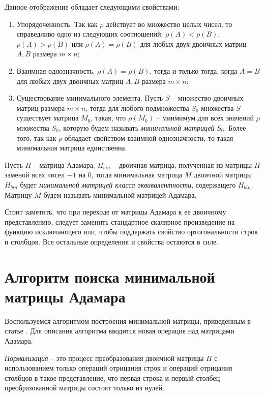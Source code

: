 Данное отображение обладает следующими свойствами:
\begin{enumerate}
    \item Упорядоченность. Так как $\rho$ действует во множество целых чисел, то справедливо одно из следующих соотношений: $\rho(A) < \rho(B)$, $\rho(A) > \rho(B)$ или $\rho(A) = \rho(B)$ для любых двух двоичных матриц $A, B$ размера $m \times n$;
    \item Взаимная однозначность. $\rho(A) = \rho(B)$, тогда и только тогда, когда $A = B$ для любых двух двоичных матриц $A, B$ размера $m \times n$;
    \item Существование минимального элемента. Пусть $S$ -- множество двоичных матриц размера $m \times n$, тогда для любого подмножества $S_0$ множества $S$ существует матрица $M_0$, такая, что $\rho(M_0)$ -- минмимум для всех значений $\rho$ множества $S_0$, которую будем называть {\it минимальной матрицей} $S_0$. Более того, так как $\rho$ обладает свойством взаимной однозначности, то такая минимальная матрица единственна.
\end{enumerate}

\begin{Df}\normalfont\label{df:min_had}
    Пусть $H$ -- матрица Адамара, $H_{bin}$ -- двоичная матрица, полученная из матрицы $H$ заменой всех чисел $-1$ на $0$, тогда минимальная матрица $M$ двоичной матрицы $H_{bin}$ будет {\it минимальной матрицей класса эквивалентности}, содержащего $H_{bin}$. Матрицу $M$ будем называть минимальной матрицей Адамара.
\end{Df}

Стоит заметить, что при переходе от матрицы Адамара к ее двоичному представлению, следует заменить стандартное скалярное произведение на функцию исключающего или, чтобы поддержать свойство ортогональности строк и столбцов. Все остальные определения и свойства остаются в силе.

\section{Алгоритм поиска минимальной матрицы Адамара}
\label{mm_finder_th}

Воспользуемся алгоритмом построения минимальной матрицы, приведенным в статье \cite{park_song:he}. Для описания алгоритма вводится новая операция над матрицами Адамара.

\begin{Df}[Нормализация]\normalfont\label{df:norm}
    {\it Нормализация} -- это процесс преобразования двоичной матрицы $H$ с использованием только операций отрицания строк и операций отрицания столбцов в такое представление, что первая строка и первый столбец преобразованной матрицы состоят только из нулей.
\end{Df}

